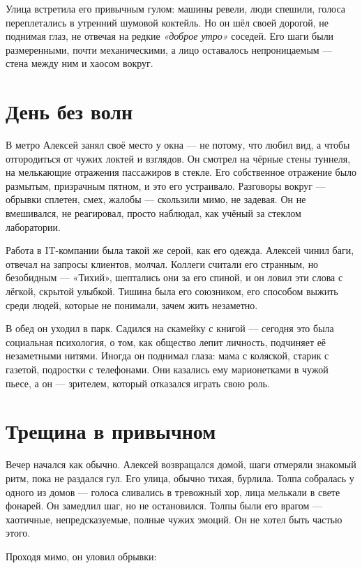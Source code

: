 \documentclass[12pt,a4paper]{book}
\begin{document}
Улица встретила его привычным гулом: машины ревели, люди спешили, голоса переплетались в утренний шумовой коктейль. Но он шёл своей дорогой, не поднимая глаз, не отвечая на редкие \textit{«доброе утро»} соседей. Его шаги были размеренными, почти механическими, а лицо оставалось непроницаемым --- стена между ним и хаосом вокруг.

\section{День без волн}

В метро Алексей занял своё место у окна --- не потому, что любил вид, а чтобы отгородиться от чужих локтей и взглядов. Он смотрел на чёрные стены туннеля, на мелькающие отражения пассажиров в стекле. Его собственное отражение было размытым, призрачным пятном, и это его устраивало. Разговоры вокруг --- обрывки сплетен, смех, жалобы --- скользили мимо, не задевая. Он не вмешивался, не реагировал, просто наблюдал, как учёный за стеклом лаборатории.

Работа в IT-компании была такой же серой, как его одежда. Алексей чинил баги, отвечал на запросы клиентов, молчал. Коллеги считали его странным, но безобидным --- «Тихий», шептались они за его спиной, и он ловил эти слова с лёгкой, скрытой улыбкой. Тишина была его союзником, его способом выжить среди людей, которые не понимали, зачем жить незаметно.

В обед он уходил в парк. Садился на скамейку с книгой --- сегодня это была социальная психология, о том, как общество лепит личность, подчиняет её незаметными нитями. Иногда он поднимал глаза: мама с коляской, старик с газетой, подростки с телефонами. Они казались ему марионетками в чужой пьесе, а он --- зрителем, который отказался играть свою роль.

\section{Трещина в привычном}

Вечер начался как обычно. Алексей возвращался домой, шаги отмеряли знакомый ритм, пока не раздался гул. Его улица, обычно тихая, бурлила. Толпа собралась у одного из домов --- голоса сливались в тревожный хор, лица мелькали в свете фонарей. Он замедлил шаг, но не остановился. Толпы были его врагом --- хаотичные, непредсказуемые, полные чужих эмоций. Он не хотел быть частью этого.

Проходя мимо, он уловил обрывки:
\end{document}
